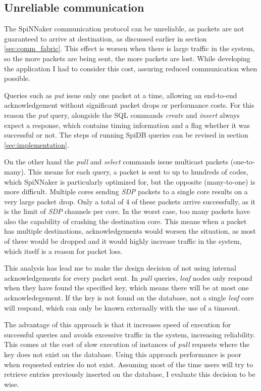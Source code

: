\subsection{Unreliable communication}
\label{sec:unreliable_comm}

The SpiNNaker communication protocol can be unreliable, as packets are not guaranteed to arrive at destination, as discussed earlier in section \ref{sec:comm_fabric}. This effect is worsen when there is large traffic in the system, so the more packets are being sent, the more packets are lost. While developing the application I had to consider this cost, assuring reduced communication when possible. 

Queries such as \textit{put} issue only one packet at a time, allowing an end-to-end acknowledgement without significant packet drops or performance costs. For this reason the \textit{put} query, alongside the SQL commands \textit{create} and \textit{insert} always expect a response, which contains timing information and a flag whether it was successful or not. The steps of running SpiDB queries can be revised in section \ref{sec:implementation}.

On the other hand the \textit{pull} and \textit{select} commands issue multicast packets (one-to-many). This means for each query, a packet is sent to up to hundreds of codes, which SpiNNaker is particularly optimized for, but the opposite (many-to-one) is more difficult. Multiple cores sending \textit{SDP} packets to a single core results on a very large packet drop. Only a total of 4 of these packets arrive successfully, as it is the limit of \textit{SDP} channels per core. In the worst case, too many packets have also the capability of crashing the destination core.
This means when a packet has multiple destinations, acknowledgements would worsen the situation, as most of these would be dropped and it would highly increase traffic in the system, which itself is a reason for packet loss.

This analysis has lead me to make the design decision of not using internal acknowledgements for every packet sent. In \textit{pull} queries, \textit{leaf} nodes only respond when they have found the specified key, which means there will be at most one acknowledegement. If the key is not found on the database, not a single \textit{leaf} core will respond, which can only be known externally with the use of a timeout.

The advantage of this approach is that it increases speed of execution for successful queries and avoids excessive traffic in the system, increasing reliability. This comes at the cost of slow execution of instances of \textit{pull} requests where the key does not exist on the database. Using this approach performance is poor when requested entries do not exist. Assuming most of the time users will try to retrieve entries previously inserted on the database, I evaluate this decision to be wise.

